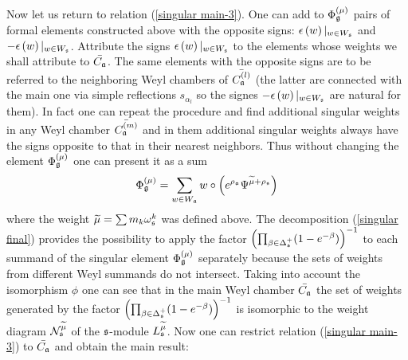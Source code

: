 Now let us return to relation (\ref{singular main-3}). One can add to $%
\Phi _{\frak{g}}^{\left( \mu \right) }$ pairs of formal elements
constructed above  with the opposite signs: $\epsilon \left( w\right)
|_{w\in W_{\frak{s}}}$ and $-\epsilon \left( w\right) |_{w\in W_{\frak{s}}}$. 
Attribute the signs $\epsilon \left( w\right) |_{w\in W_{\frak{s}}}$ to
the elements whose weights we shall attribute to $\bar{C_{\frak{a}}}$. 
The same elements with the opposite signs are to be referred to the
neighboring Weyl chambers of $\bar{C_{\frak{a}}^{(l)}}$ (the latter are
connected with the main one via simple reflections $s_{\alpha _{l}}$ so the
signes $-\epsilon \left( w\right) |_{w\in W_{\frak{s}}}$ are natural for
them). In fact one can repeat the procedure and find additional singular
weights in any Weyl chamber $\bar{C_{\frak{a}}^{(m)}}$ and in them
additional singular weights always have the signs opposite to that in their
nearest neighbors. Thus without changing the element $\Phi _{\frak{g}%
}^{\left( \mu \right) }$ one can present it as a sum
\begin{equation}
\Phi _{\frak{g}}^{\left( \mu \right) }=\sum_{w\in W_{\frak{a}}}w\circ \left(
e^{\rho _{\frak{a}}}\Psi ^{\widetilde{\mu }+\rho _{\frak{s}}}\right)
\label{singular final}
\end{equation}
where the weight $\widetilde{\mu }=\sum m_{k}\omega _{\frak{s}}^{k}$ was
defined above. The decomposition (\ref{singular final}) provides the
possibility to apply the factor $\left( \prod_{\beta \in \Delta _{\frak{s}%
}^{+}}(1-e^{-\beta })\right) ^{-1}$ to each summand of the singular element $%
\Phi _{\frak{g}}^{\left( \mu \right) }$ separately because the sets of
weights from different Weyl summands do not intersect. Taking into account
the isomorphism $\phi $ one can see that in the main Weyl chamber $\bar{C_{%
\frak{a}}}$ the set of weights generated by the factor $\left( \prod_{\beta
\in \Delta _{\frak{s}}^{+}}(1-e^{-\beta })\right) ^{-1}$ is isomorphic to
the weight diagram $\mathcal{N}_{\frak{s}}^{\widetilde{\mu }}$ of the $\frak{%
s}$-module $L_{\frak{s}}^{\widetilde{\mu }}$. Now one can restrict
relation (\ref{singular main-3}) to $\bar{C_{\frak{a}}}$ and obtain the main
result:
